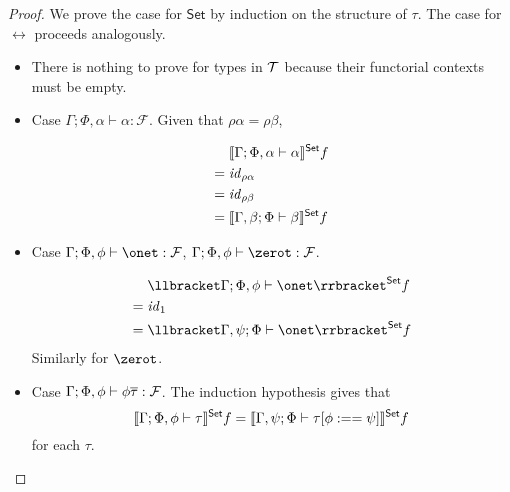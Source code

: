 \documentclass[acmsmall,review,anonymous]{acmart}
\theoremstyle{definition}
\newcommand{\F}{\mathcal{F}}
\newcommand{\set}{\mathsf{Set}}
\renewcommand{\id}{\mathit{id}}
\begin{document}
\begin{proof}
We prove the case for $\set$ by induction on the structure of $\tau$.
The case for $\rel$ proceeds analogously.

\begin{itemize}
  \item There is nothing to prove for types in $\mathcal{T}$ because their functorial contexts
        must be empty.
  \item Case $\Gamma; \Phi, \alpha \vdash \alpha : \F$. Given that $\rho \alpha = \rho \beta$, 
      
    \begin{align*}
         & \setsem{\Gamma; \Phi, \alpha \vdash \alpha } f \\
      = \; & \id_{\rho \alpha} \\
      = \; & \id_{\rho \beta}  \\
      = \; & \setsem{\Gamma, \beta; \Phi \vdash \beta } f
    \end{align*}

  \item Case $\Gamma; \Phi, \phi \vdash \onet :\F$,  $\Gamma; \Phi, \phi \vdash \zerot :\F$.

    \begin{align*}
         & \setsem{\Gamma; \Phi, \phi \vdash \onet } f \\
      = \; & \id_1 \\
      = \; & \setsem{\Gamma, \psi; \Phi \vdash \onet } f
    \end{align*}
    Similarly for $\zerot$.

  \item Case $\Gamma; \Phi, \phi \vdash \phi \ol\tau : \F$. The induction hypothesis gives that 
    $$\setsem{\Gamma; \Phi, \phi \vdash \tau} f = 
      \setsem{\Gamma, \psi; \Phi \vdash \tau[\phi :== \psi]} f$$
    for each $\tau$.


\end{itemize}
\end{proof}
\end{document}
